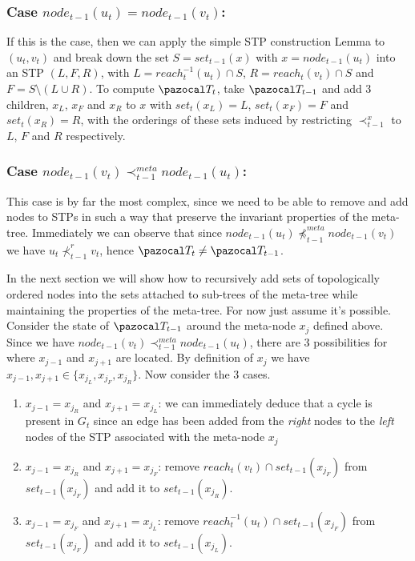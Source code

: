 \documentclass{report}
\begin{document}
\subsubsection{Case $node_{t-1}(u_t) = node_{t-1}(v_t)$:}

If this is the case, then we can apply the simple STP construction Lemma to $(u_t,v_t)$ and break down the set $S=set_{t-1}(x)$ with $x=node_{t-1}(u_t)$ into an STP $(L,F,R)$, with $L=reach_t^{-1}(u_t) \cap S$, $R=reach_t(v_t) \cap S$ and $F=S \setminus (L \cup R)$. To compute $\pazocal T_t$, take $\pazocal T_{t-1}$ and add 3 children, $x_{L}$, $x_{F}$ and $x_{R}$ to $x$ with $set_t(x_{L}) = L$, $set_t(x_{F}) = F$ and $set_t(x_{R}) = R$, with the orderings of these sets induced by restricting $\prec_{t-1}^{x}$ to $L$, $F$ and $R$ respectively.

\subsubsection{Case $node_{t-1}(v_t) \prec_{t-1}^{meta} node_{t-1}(u_t)$:}

This case is by far the most complex, since we need to be able to remove and add nodes to STPs in such a way that preserve the invariant properties of the meta-tree. Immediately we can observe that since $node_{t-1}(u_t) \npreceq^{meta}_{t-1} node_{t-1}(v_t)$ we have $u_t \nprec^{r}_{t-1} v_t$, hence $\pazocal T_t \neq \pazocal T_{t-1}$.

In the next section we will show how to recursively add sets of topologically ordered nodes into the sets attached to sub-trees of the meta-tree while maintaining the properties of the meta-tree. For now just assume it's possible. Consider the state of $\pazocal T_{t-1}$ around the meta-node $x_j$ defined above. Since we have $node_{t-1}(v_t) \prec_{t-1}^{meta} node_{t-1}(u_t)$, there are 3 possibilities for where $x_{j-1}$ and $x_{j+1}$ are located. By definition of $x_j$ we have $x_{j-1}, x_{j+1} \in \{ x_{j}_{L}, x_{j}_{F}, x_{j}_{R} \}$. Now consider the 3 cases.

\begin{enumerate}
    \item $x_{j-1}=x_{j}_{R}$ and $x_{j+1}=x_{j}_{L}$: we can immediately deduce that a cycle is present in $G_t$ since an edge has been added from the \textit{right} nodes to the \textit{left} nodes of the STP associated with the meta-node $x_{j}$
    
    \item $x_{j-1}=x_{j}_{R}$ and $x_{j+1}=x_{j}_{F}$: remove $reach_t(v_t) \cap set_{t-1}(x_{j}_{F})$ from $set_{t-1}(x_{j}_{F})$ and add it to $set_{t-1}(x_{j}_{R})$.
    
    \item $x_{j-1}=x_{j}_{F}$ and $x_{j+1}=x_{j}_{L}$: remove $reach_t^{-1}(u_t) \cap set_{t-1}(x_{j}_{F})$ from $set_{t-1}(x_{j}_{F})$ and add it to $set_{t-1}(x_{j}_{L})$.
\end{enumerate}
\end{document}
